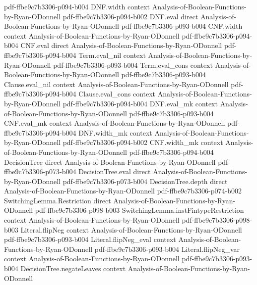 \begin{theorem}
  {pdf-ffbe9c7b3306-p094-b004}
\proofstep
  {DNF.width}
  {context}
  {Analysis-of-Boolean-Functions-by-Ryan-ODonnell}
  {pdf-ffbe9c7b3306-p094-b002}
\proofstep
  {DNF.eval}
  {direct}
  {Analysis-of-Boolean-Functions-by-Ryan-ODonnell}
  {pdf-ffbe9c7b3306-p093-b004}
\proofstep
  {CNF.width}
  {context}
  {Analysis-of-Boolean-Functions-by-Ryan-ODonnell}
  {pdf-ffbe9c7b3306-p094-b004}
\proofstep
  {CNF.eval}
  {direct}
  {Analysis-of-Boolean-Functions-by-Ryan-ODonnell}
  {pdf-ffbe9c7b3306-p094-b004}
\proofstep
  {Term.eval_nil}
  {context}
  {Analysis-of-Boolean-Functions-by-Ryan-ODonnell}
  {pdf-ffbe9c7b3306-p093-b004}
\proofstep
  {Term.eval_cons}
  {context}
  {Analysis-of-Boolean-Functions-by-Ryan-ODonnell}
  {pdf-ffbe9c7b3306-p093-b004}
\proofstep
  {Clause.eval_nil}
  {context}
  {Analysis-of-Boolean-Functions-by-Ryan-ODonnell}
  {pdf-ffbe9c7b3306-p094-b004}
\proofstep
  {Clause.eval_cons}
  {context}
  {Analysis-of-Boolean-Functions-by-Ryan-ODonnell}
  {pdf-ffbe9c7b3306-p094-b004}
\proofstep
  {DNF.eval_mk}
  {context}
  {Analysis-of-Boolean-Functions-by-Ryan-ODonnell}
  {pdf-ffbe9c7b3306-p093-b004}
\proofstep
  {CNF.eval_mk}
  {context}
  {Analysis-of-Boolean-Functions-by-Ryan-ODonnell}
  {pdf-ffbe9c7b3306-p094-b004}
\proofstep
  {DNF.width_mk}
  {context}
  {Analysis-of-Boolean-Functions-by-Ryan-ODonnell}
  {pdf-ffbe9c7b3306-p094-b002}
\proofstep
  {CNF.width_mk}
  {context}
  {Analysis-of-Boolean-Functions-by-Ryan-ODonnell}
  {pdf-ffbe9c7b3306-p094-b004}
\proofstep
  {DecisionTree}
  {direct}
  {Analysis-of-Boolean-Functions-by-Ryan-ODonnell}
  {pdf-ffbe9c7b3306-p073-b004}
\proofstep
  {DecisionTree.eval}
  {direct}
  {Analysis-of-Boolean-Functions-by-Ryan-ODonnell}
  {pdf-ffbe9c7b3306-p073-b004}
\proofstep
  {DecisionTree.depth}
  {direct}
  {Analysis-of-Boolean-Functions-by-Ryan-ODonnell}
  {pdf-ffbe9c7b3306-p074-b002}
\proofstep
  {SwitchingLemma.Restriction}
  {direct}
  {Analysis-of-Boolean-Functions-by-Ryan-ODonnell}
  {pdf-ffbe9c7b3306-p098-b003}
\proofstep
  {SwitchingLemma.instFintypeRestriction}
  {context}
  {Analysis-of-Boolean-Functions-by-Ryan-ODonnell}
  {pdf-ffbe9c7b3306-p098-b003}
\proofstep
  {Literal.flipNeg}
  {context}
  {Analysis-of-Boolean-Functions-by-Ryan-ODonnell}
  {pdf-ffbe9c7b3306-p093-b004}
\proofstep
  {Literal.flipNeg_eval}
  {context}
  {Analysis-of-Boolean-Functions-by-Ryan-ODonnell}
  {pdf-ffbe9c7b3306-p093-b004}
\proofstep
  {Literal.flipNeg_var}
  {context}
  {Analysis-of-Boolean-Functions-by-Ryan-ODonnell}
  {pdf-ffbe9c7b3306-p093-b004}
\proofstep
  {DecisionTree.negateLeaves}
  {context}
  {Analysis-of-Boolean-Functions-by-Ryan-ODonnell}

\end{theorem}
